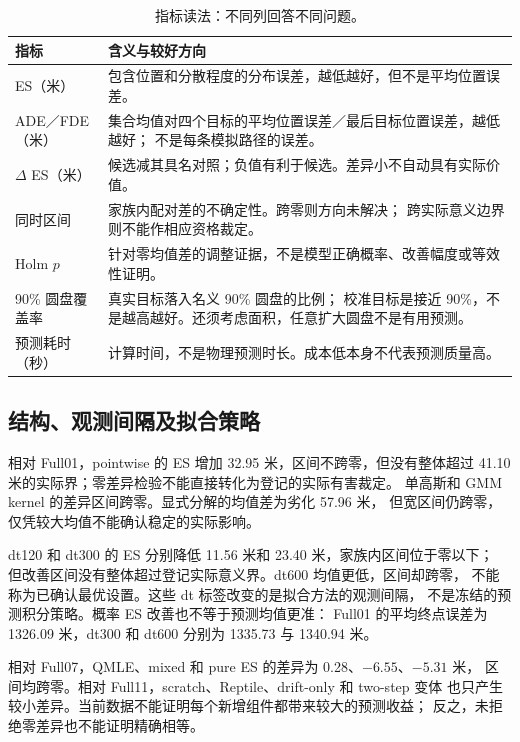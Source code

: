 \documentclass[UTF8,11pt]{ctexart}
\begin{document}
\begin{table}[htbp]
\centering\small
\caption{指标读法：不同列回答不同问题。}
\label{tab:metric-reader}
\begin{tabular}{@{}p{.22\linewidth}p{.69\linewidth}@{}}
\toprule
指标 & 含义与较好方向\\
\midrule
ES（米） & 包含位置和分散程度的分布误差，越低越好，但不是平均位置误差。\\
ADE／FDE（米） & 集合均值对四个目标的平均位置误差／最后目标位置误差，越低越好；
不是每条模拟路径的误差。\\
$\Delta$ ES（米） & 候选减其具名对照；负值有利于候选。差异小不自动具有实际价值。\\
同时区间 & 家族内配对差的不确定性。跨零则方向未解决；
跨实际意义边界则不能作相应资格裁定。\\
Holm $p$ & 针对零均值差的调整证据，不是模型正确概率、改善幅度或等效性证明。\\
90\% 圆盘覆盖率 & 真实目标落入名义 90\% 圆盘的比例；
校准目标是接近 90\%，不是越高越好。还须考虑面积，任意扩大圆盘不是有用预测。\\
预测耗时（秒） & 计算时间，不是物理预测时长。成本低本身不代表预测质量高。\\
\bottomrule
\end{tabular}
\end{table}

\FloatBarrier
\subsection{结构、观测间隔及拟合策略}
\label{sec:method-findings}
相对 Full01，pointwise 的 ES 增加 32.95 米，区间不跨零，但没有整体超过
41.10 米的实际界；零差异检验不能直接转化为登记的实际有害裁定。
单高斯和 GMM kernel 的差异区间跨零。显式分解的均值差为劣化 57.96 米，
但宽区间仍跨零，仅凭较大均值不能确认稳定的实际影响。

dt120 和 dt300 的 ES 分别降低 11.56 米和 23.40 米，家族内区间位于零以下；
但改善区间没有整体超过登记实际意义界。dt600 均值更低，区间却跨零，
不能称为已确认最优设置。这些 dt 标签改变的是拟合方法的观测间隔，
不是冻结的预测积分策略。概率 ES 改善也不等于预测均值更准：
Full01 的平均终点误差为 1326.09 米，dt300 和 dt600 分别为 1335.73 与 1340.94 米。

相对 Full07，QMLE、mixed 和 pure ES 的差异为 0.28、$-6.55$、$-5.31$ 米，
区间均跨零。相对 Full11，scratch、Reptile、drift-only 和 two-step 变体
也只产生较小差异。当前数据不能证明每个新增组件都带来较大的预测收益；
反之，未拒绝零差异也不能证明精确相等。
\end{document}
